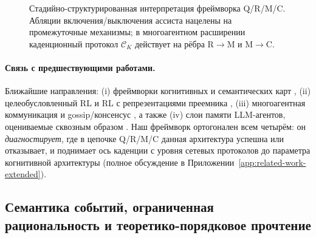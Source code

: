 \documentclass{article}
\begin{document}
\begin{figure}[t]
  \centering
  \caption{Стадийно-структурированная интерпретация фреймворка Q/R/M/C. Абляции включения/выключения ассиста нацелены на промежуточные механизмы; в многоагентном расширении каденционный протокол $\mathcal{C}_K$ действует на рёбра R$\to$M и M$\to$C.}
  \label{fig:causal}
\end{figure}

\paragraph{Связь с предшествующими работами.} Ближайшие направления: (i) фреймворки когнитивных и семантических карт \citep{tolman1948cognitive,okeefe1978hippocampus,kuipers2000spatial,gupta2017cognitive,savinov2018semi}, (ii) целеобусловленный RL и RL с репрезентациями преемника \citep{andrychowicz2017hindsight,ghosh2021learning,dayan1993improving,stachenfeld2017hippocampus,momennejad2017successor}, (iii) многоагентная коммуникация \citep{lowe2017maddpg,foerster2018ctde,sukhbaatar2016commnet,foerster2016learning} и gossip/консенсус \citep{boyd2006gossip,xiao2007distributed}, а также (iv) слои памяти LLM-агентов, оцениваемые сквозным образом \citep{wang2023voyager,shinn2023reflexion,packer2023memgpt}. Наш фреймворк ортогонален всем четырём: он \emph{диагностирует}, где в цепочке Q/R/M/C данная архитектура успешна или отказывает, и поднимает ось каденции с уровня сетевых протоколов до параметра когнитивной архитектуры (полное обсуждение в Приложении~\ref{app:related-work-extended}).

\subsection{Семантика событий, ограниченная рациональность и теоретико-порядковое прочтение}
\label{sec:event-semantics}
\end{document}
